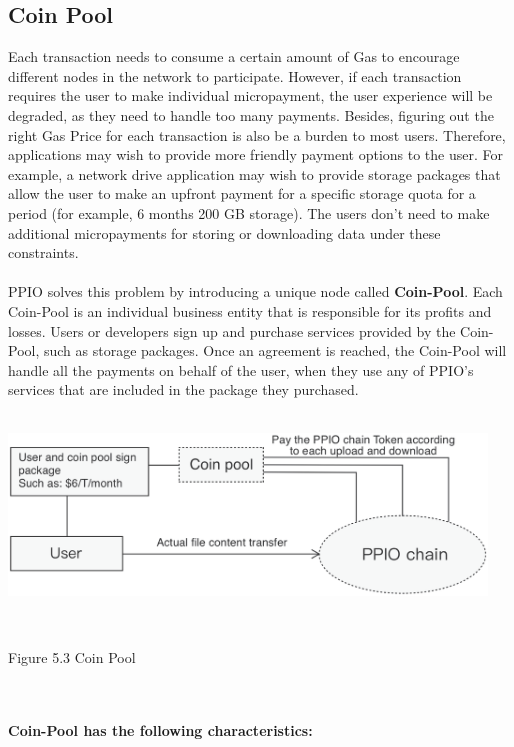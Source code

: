 \documentclass[10pt,a4paper]{article}
\begin{document}
\subsection{Coin Pool}  %
Each transaction needs to consume a certain amount of Gas to encourage different nodes in the network to participate. However, if each transaction requires the user to make individual micropayment, the user experience will be degraded, as they need to handle too many payments. Besides, figuring out the right Gas Price for each transaction is also be a burden to most users. Therefore, applications may wish to provide more friendly payment options to the user. For example, a network drive application may wish to provide storage packages that allow the user to make an upfront payment for a specific storage quota for a period (for example, 6 months 200 GB storage). The users don’t need to make additional micropayments for storing or downloading data under these constraints.
 \vspace{-0.5em}
\\ \\PPIO solves this problem by introducing a unique node called {\bf Coin-Pool}. Each Coin-Pool is an individual business entity that is responsible for its profits and losses. Users or developers sign up and purchase services provided by the Coin-Pool, such as storage packages.  Once an agreement is reached, the Coin-Pool will handle all the payments on behalf of the user, when they use any of PPIO’s services that are included in the package they purchased.
 \vspace{-0.5em}
\\
\\\centerline{\includegraphics[width=360pt]{fig23}}
\\\centerline{{Figure 5.3 Coin Pool}}%
 \vspace{-0.5em}
 \\ \\
 {  \bf Coin-Pool has the following characteristics:}
  \vspace{-0.8em}
\\
\end{document}
